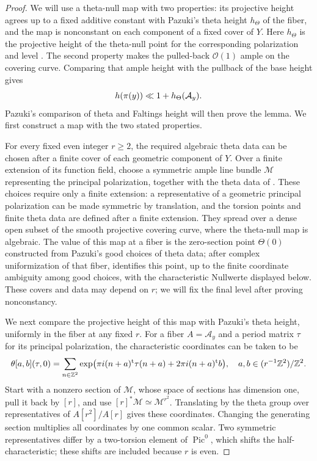 \begin{proof}
We will use a theta-null map with two properties: its projective height
agrees up to a fixed additive constant with Pazuki's theta height
$h_\Theta$ of the fiber, and the map is nonconstant on each component
of a fixed cover of $Y$.  Here $h_\Theta$ is the projective height of
the theta-null point for the corresponding polarization and level
\cite[Section 2.3]{Pazuki2012}.  The second property makes the pulled-back
$\mathcal O(1)$ ample on the covering curve.  Comparing that ample
height with the pullback of the base height gives
\[
 h(\pi(y))\ll 1+h_\Theta(\mathcal A_y).
\]
Pazuki's comparison of theta and Faltings height will then prove the
lemma.  We first construct a map with the two stated properties.

For every fixed even integer $r\ge2$, the required algebraic theta
data can be chosen after a finite cover of each geometric component
of $Y$.  Over a finite extension of its function field, choose a
symmetric ample line bundle $\mathcal M$ representing the principal
polarization, together with the theta data of
\cite[Section 2.3]{Pazuki2012}.  These choices require only a finite
extension: a representative of a geometric principal polarization
can be made symmetric by translation, and the torsion points and
finite theta data are defined after a finite extension.  They spread
over a dense open subset of the smooth projective covering curve,
where the theta-null map is algebraic.  The value of this map at a
fiber is the zero-section point $\Theta(0)$ constructed from Pazuki's
good choices of theta data; after complex uniformization of that fiber,
\cite[Sections~2.3.2--2.3.4]{Pazuki2012} identifies this point, up to the finite
coordinate ambiguity among good choices, with the characteristic
Nullwerte displayed below.  These covers and data may
depend on $r$; we will fix the final level after proving nonconstancy.

We next compare the projective height of this map with Pazuki's theta
height, uniformly in the fiber at any fixed $r$.  For a fiber
$A=\mathcal A_y$ and a period matrix $\tau$ for its principal
polarization, the characteristic coordinates can be taken to be
\begin{equation}\label{hei:theta-series}
 \theta[a,b](\tau,0)=
 \sum_{n\in\mathbb Z^2}
   \exp\bigl(\pi i(n+a)^{\mathrm t}\tau(n+a)
                       +2\pi i(n+a)^{\mathrm t}b\bigr),
 \quad a,b\in(r^{-1}\mathbb Z^2)/\mathbb Z^2.
\end{equation}
Start with a nonzero section of $\mathcal M$, whose space of sections
has dimension one, pull it back by $[r]$, and use
$[r]^*\mathcal M\simeq\mathcal M^{r^2}$.  Translating by the theta
group over representatives of $A[r^2]/A[r]$ gives these coordinates.
Changing the generating section multiplies all coordinates by one
common scalar.  Two symmetric representatives differ by a
two-torsion element of $\operatorname{Pic}^0$, which shifts the
half-characteristic; these shifts are included because $r$ is even.


\end{proof}
